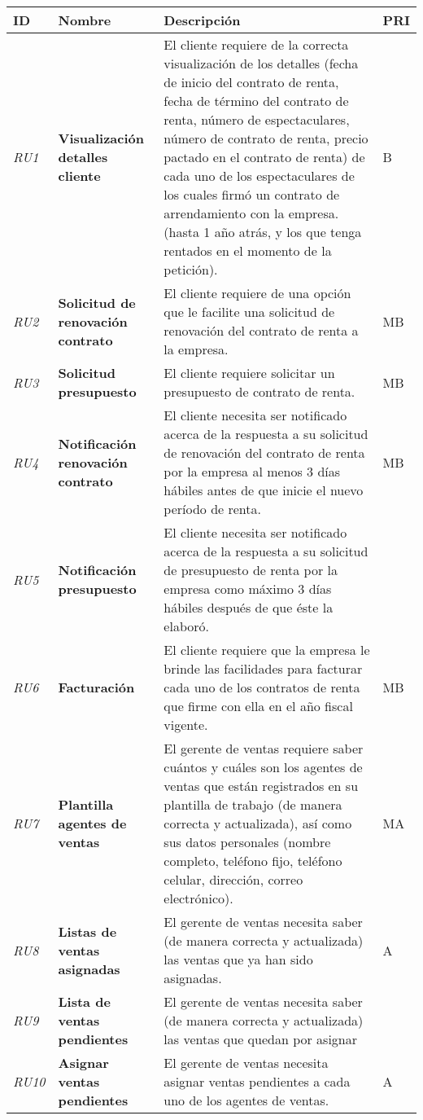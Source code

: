 \begin{longtable}[H]{m{2cm}m{3cm}m{5cm}m{2cm}}
\toprule
\centering \textbf{ID} & \centering  \textbf{Nombre} & \centering \textbf{Descripción} & \centering \textbf{PRI} \tabularnewline
\midrule
\textit{RU1} &\textbf{Visualización detalles cliente} & El cliente requiere de la correcta visualización de los detalles (fecha de inicio del contrato de renta, fecha de término del contrato de renta, número de espectaculares, número de contrato de renta, precio pactado en el contrato de renta) de cada uno de los espectaculares  de los cuales firmó un contrato de arrendamiento con la empresa. (hasta 1 año atrás, y los que  tenga rentados en el momento de la petición). & B\tabularnewline
\textit{RU2} &\textbf{Solicitud de renovación contrato} & El cliente requiere de una opción que le facilite una solicitud de renovación del contrato de renta a la empresa. & MB\tabularnewline
\textit{RU3} &\textbf{Solicitud presupuesto} & El cliente requiere solicitar un presupuesto de contrato de renta. & MB\tabularnewline
\textit{RU4} &\textbf{Notificación renovación contrato} & El cliente necesita ser notificado acerca de la respuesta a su solicitud de renovación del contrato de renta por la empresa al menos 3 días hábiles antes de  que inicie el nuevo período de renta. & MB\tabularnewline
\textit{RU5} &\textbf{Notificación presupuesto} & El cliente necesita ser notificado acerca de la respuesta  a su solicitud de presupuesto de renta por la empresa como máximo 3 días hábiles después de que éste la elaboró. &\tabularnewline
\textit{RU6} &\textbf{Facturación} & El cliente requiere que la empresa le brinde las facilidades para facturar cada uno de los contratos de renta que firme con ella en el año fiscal vigente. & MB\tabularnewline
\textit{RU7} &\textbf{Plantilla agentes de ventas} & El gerente de ventas requiere saber cuántos y cuáles son los agentes de ventas que están registrados en su plantilla de trabajo (de manera correcta y actualizada), así como sus datos personales (nombre completo, teléfono fijo, teléfono celular, dirección, correo electrónico). & MA\tabularnewline
\textit{RU8} &\textbf{Listas de ventas asignadas} & El gerente de ventas necesita saber (de manera correcta y actualizada) las ventas que ya han sido asignadas. & A\tabularnewline
\textit{RU9} &\textbf{Lista de ventas pendientes} & El gerente de ventas necesita saber (de manera correcta y actualizada) las ventas que quedan por asignar &\tabularnewline
\textit{RU10} &\textbf{Asignar ventas pendientes} & El gerente de ventas necesita asignar ventas pendientes a cada uno de los agentes de ventas. & A\tabularnewline

\end{longtable}
